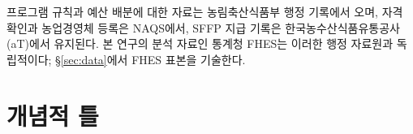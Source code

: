 \documentclass[12pt, a4paper]{article}
\begin{document}
프로그램 규칙과 예산 배분에 대한 자료는 농림축산식품부 행정 기록에서 오며, 자격 확인과 농업경영체 등록은 NAQS에서, SFFP 지급 기록은 한국농수산식품유통공사(aT)에서 유지된다. 본 연구의 분석 자료인 통계청 FHES는 이러한 행정 자료원과 독립적이다; \S\ref{sec:data}에서 FHES 표본을 기술한다.

\section{개념적 틀}
\label{sec:theory}

\end{document}
